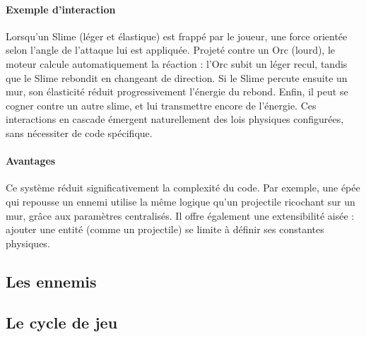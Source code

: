 \documentclass[a4paper,11pt]{article}
\begin{document}
\paragraph{Exemple d'interaction}  
Lorsqu’un Slime (léger et élastique) est frappé par le joueur, une force orientée selon l’angle de l’attaque lui est appliquée. Projeté contre un Orc (lourd), le moteur calcule automatiquement la réaction : l’Orc subit un léger recul, tandis que le Slime rebondit en changeant de direction. Si le Slime percute ensuite un mur, son élasticité réduit progressivement l’énergie du rebond. Enfin, il peut se cogner contre un autre slime, et lui transmettre encore de l’énergie. Ces interactions en cascade émergent naturellement des lois physiques configurées, sans nécessiter de code spécifique.

\paragraph{Avantages}  
Ce système réduit significativement la complexité du code. Par exemple, une épée qui repousse un ennemi utilise la même logique qu’un projectile ricochant sur un mur, grâce aux paramètres centralisés. Il offre également une extensibilité aisée : ajouter une entité (comme un projectile) se limite à définir ses constantes physiques.

\subsection{Les ennemis}

\subsection{Le cycle de jeu}
\end{document}
